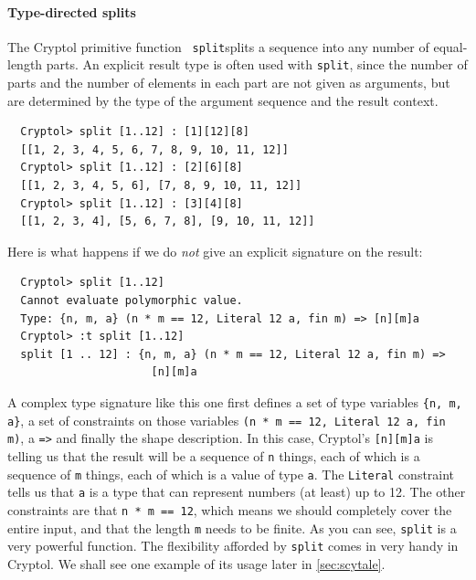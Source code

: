 \paragraph*{Type-directed splits} The Cryptol primitive function {\tt
  split}\indSplit splits a sequence into any number of equal-length
parts. An explicit result type is often used with {\tt split}, since
the number of parts and the number of elements in each part are not
given as arguments, but are determined by the type of the argument
sequence and the result context.
\begin{Verbatim}
  Cryptol> split [1..12] : [1][12][8]
  [[1, 2, 3, 4, 5, 6, 7, 8, 9, 10, 11, 12]]
  Cryptol> split [1..12] : [2][6][8]
  [[1, 2, 3, 4, 5, 6], [7, 8, 9, 10, 11, 12]]
  Cryptol> split [1..12] : [3][4][8]
  [[1, 2, 3, 4], [5, 6, 7, 8], [9, 10, 11, 12]]
\end{Verbatim}
Here is what happens if we do {\em not} give an explicit signature on
the result:\indSignature
\begin{Verbatim}
  Cryptol> split [1..12]
  Cannot evaluate polymorphic value.
  Type: {n, m, a} (n * m == 12, Literal 12 a, fin m) => [n][m]a
  Cryptol> :t split [1..12]
  split [1 .. 12] : {n, m, a} (n * m == 12, Literal 12 a, fin m) =>
                      [n][m]a
\end{Verbatim}

A complex type signature like this one first defines a set of type
variables \verb|{n, m, a}|, a set of constraints on those variables
\verb|(n * m == 12, Literal 12 a, fin m)|, a \texttt{=>} and finally
the shape description. In this case, Cryptol's \texttt{[n][m]a} is
telling us that the result will be a sequence of \texttt{n} things,
each of which is a sequence of \texttt{m} things, each of which is a
value of type \texttt{a}. The \texttt{Literal} constraint tells us
that \texttt{a} is a type that can represent numbers (at least) up to
12. The other constraints are that \texttt{n * m == 12}, which means
we should completely cover the entire input, and that the length
\texttt{m} needs to be finite. As you can see, \texttt{split} is a
very powerful function. The flexibility afforded by \texttt{split}
comes in very handy in Cryptol. We shall see one example of its usage
later in \autoref{sec:scytale}.

